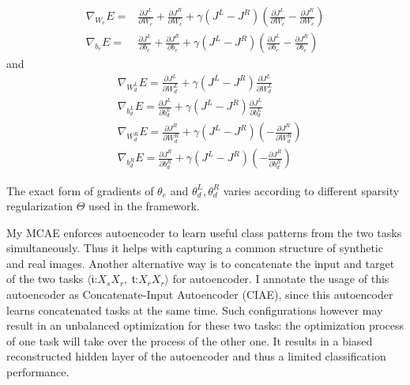\documentclass{iitthesis}
\begin{document}
\begin{equation}
\begin{split}\nabla_{W_{e}}E= & \frac{\partial{J^{L}}}{\partial{W_{e}}}+\frac{\partial{J^{R}}}{\partial{W_{e}}}+\gamma(J^{L}-J^{R})(\frac{\partial{J^{L}}}{\partial{W_{e}}}-\frac{\partial{J^{R}}}{\partial{W_{e}}})\\
\nabla_{b_{e}}E= & \frac{\partial{J^{L}}}{\partial{b_{e}}}+\frac{\partial{J^{R}}}{\partial{b_{e}}}+\gamma(J^{L}-J^{R})(\frac{\partial{J^{L}}}{\partial{b_{e}}}-\frac{\partial{J^{R}}}{\partial{b_{e}}})
\end{split}
\end{equation}
and 
\begin{equation}
\begin{split} & \nabla_{W_{d}^{L}}E=\frac{\partial{J^{L}}}{\partial{W_{d}^{L}}}+\gamma(J^{L}-J^{R})\frac{\partial{J^{L}}}{\partial{W_{d}^{L}}}\\
 & \nabla_{b_{d}^{L}}E=\frac{\partial{J^{L}}}{\partial{b_{d}^{L}}}+\gamma(J^{L}-J^{R})\frac{\partial{J^{L}}}{\partial{b_{d}^{L}}}\\
 & \nabla_{W_{d}^{R}}E=\frac{\partial{J^{R}}}{\partial{W_{d}^{R}}}+\gamma(J^{L}-J^{R})(-\frac{\partial{J^{R}}}{\partial{W_{d}^{R}}})\\
 & \nabla_{b_{d}^{R}}E=\frac{\partial{J^{R}}}{\partial{b_{d}^{R}}}+\gamma(J^{L}-J^{R})(-\frac{\partial{J^{R}}}{\partial{b_{d}^{R}}})
\end{split}
\end{equation}


The exact form of gradients of $\theta_{e}$ and $\theta_{d}^{L},\theta_{d}^{R}$ varies according to different sparsity regularization $\Theta$ used in the framework.

 My MCAE enforces autoencoder to learn useful class patterns from the two tasks simultaneously. Thus it helps with capturing a common structure of synthetic and real images. Another alternative way is to concatenate the input and target of the two tasks $\langle\mathfrak{i}\text{:}X_{s}X_{r},\:\mathfrak{t}\text{:}X_{r}X_{r}\rangle$ for autoencoder. I annotate the usage of this autoencoder as Concatenate-Input Autoencoder (CIAE), since this autoencoder learns concatenated tasks at the same time. Such configurations however may result in an unbalanced optimization for these two tasks: the optimization process of one task will take over the process of the other one. It results in a biased reconstructed hidden layer of the autoencoder and thus a limited classification performance.
\end{document}
